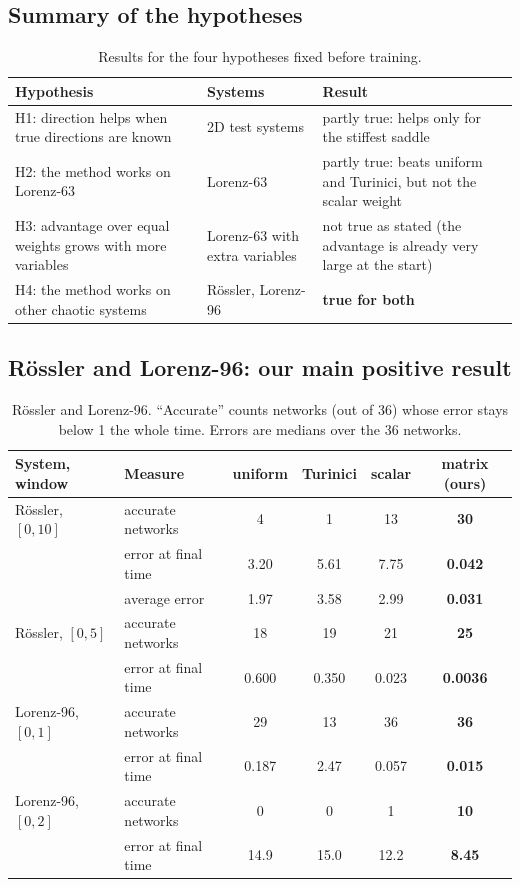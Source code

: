 \documentclass[11pt,a4paper]{article}
\begin{document}
\subsection{Summary of the hypotheses}
\begin{table}[H]\centering\small
\caption{Results for the four hypotheses fixed before training.}
\begin{tabular}{p{5.2cm}p{4.0cm}p{6.0cm}}\toprule
Hypothesis & Systems & Result\\\midrule
H1: direction helps when true directions are known & 2D test systems & partly true: helps only for the stiffest saddle\\
H2: the method works on Lorenz-63 & Lorenz-63 & partly true: beats uniform and Turinici, but not the scalar weight\\
H3: advantage over equal weights grows with more variables & Lorenz-63 with extra variables & not true as stated (the advantage is already very large at the start)\\
H4: the method works on other chaotic systems & Rössler, Lorenz-96 & \textbf{true for both}\\\bottomrule
\end{tabular}
\end{table}

\subsection{Rössler and Lorenz-96: our main positive result}
\begin{table}[H]\centering
\caption{Rössler and Lorenz-96. ``Accurate'' counts networks (out of 36) whose error stays
below 1 the whole time. Errors are medians over the 36 networks.}
\begin{tabular}{llcccc}\toprule
System, window & Measure & uniform & Turinici & scalar & \textbf{matrix (ours)}\\\midrule
Rössler, $[0,10]$ & accurate networks & 4 & 1 & 13 & \textbf{30}\\
 & error at final time & 3.20 & 5.61 & 7.75 & \textbf{0.042}\\
 & average error & 1.97 & 3.58 & 2.99 & \textbf{0.031}\\\midrule
Rössler, $[0,5]$ & accurate networks & 18 & 19 & 21 & \textbf{25}\\
 & error at final time & 0.600 & 0.350 & 0.023 & \textbf{0.0036}\\\midrule
Lorenz-96, $[0,1]$ & accurate networks & 29 & 13 & 36 & \textbf{36}\\
 & error at final time & 0.187 & 2.47 & 0.057 & \textbf{0.015}\\\midrule
Lorenz-96, $[0,2]$ & accurate networks & 0 & 0 & 1 & \textbf{10}\\
 & error at final time & 14.9 & 15.0 & 12.2 & \textbf{8.45}\\\bottomrule
\end{tabular}
\end{table}
\end{document}
